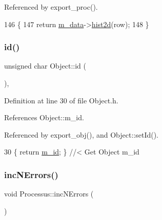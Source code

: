 Referenced by export\+\_\+proc().


\begin{DoxyCode}
146                                    \{
147     \textcolor{keywordflow}{return} \hyperlink{classProcessus_a3da9a9de8af54e2f47807a3e09dfccff}{m\_data}->\hyperlink{classData_ab717ebe242192605ad509b76df35e855}{hist2d}(row);
148   \}
\end{DoxyCode}
\mbox{\label{classObject_af99145335cc61ff6e2798ea17db009d2}} 
\subsubsection{\texorpdfstring{id()}{id()}}
{\footnotesize\ttfamily unsigned char Object\+::id (\begin{DoxyParamCaption}{ }\end{DoxyParamCaption})\hspace{0.3cm}{\ttfamily [inline]}, {\ttfamily [inherited]}}



Definition at line 30 of file Object.\+h.



References Object\+::m\+\_\+id.



Referenced by export\+\_\+obj(), and Object\+::set\+Id().


\begin{DoxyCode}
30 \{ \textcolor{keywordflow}{return} \hyperlink{classObject_aca74b9dbfed7b5556ea2d56c65b6b6b0}{m\_id};         \} \textcolor{comment}{//< Get Object m\_id }
\end{DoxyCode}
\mbox{\label{classProcessus_abe603d0636f76db6aa6c5c60cf34c591}} 
\subsubsection{\texorpdfstring{inc\+N\+Errors()}{incNErrors()}}
{\footnotesize\ttfamily void Processus\+::inc\+N\+Errors (\begin{DoxyParamCaption}{ }\end{DoxyParamCaption})\hspace{0.3cm}{\ttfamily [inherited]}}

